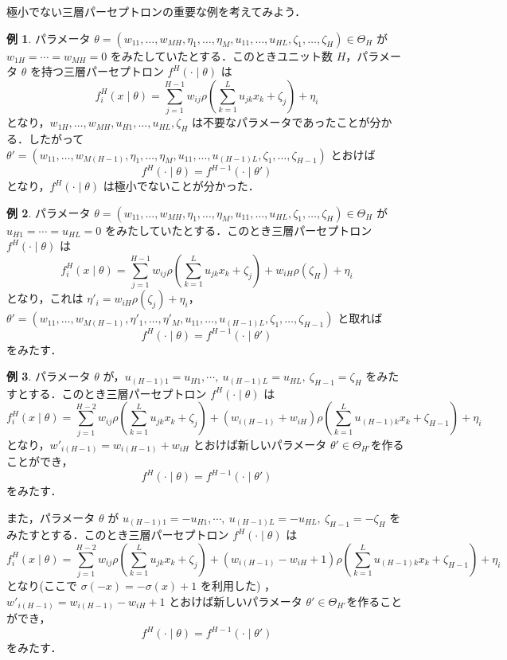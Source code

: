 \documentclass{jsarticle}
\theoremstyle{definition}
\newtheorem{example}{例}
\begin{document}
極小でない三層パーセプトロンの重要な例を考えてみよう．
\begin{example}
  パラメータ $\theta = (w_{11},\ldots, w_{MH}, \eta_1, \ldots, \eta_M, u_{11},\ldots, u_{HL}, \zeta_1, \ldots, \zeta_H) \in \Theta_H$ が $w_{1H} = \cdots = w_{MH} = 0$ をみたしていたとする．このときユニット数 $H$，パラメータ $\theta$ を持つ三層パーセプトロン $f^H(\cdot\mid\theta)$ は
  \[
    f_i^H(x\mid\theta) = \sum_{j=1}^{H-1}w_{ij}\rho\left(\sum_{k=1}^L u_{jk}x_k + \zeta_j\right) + \eta_i
  \]
  となり，$w_{1H}, \ldots, w_{MH}, u_{H1},\ldots, u_{HL}, \zeta_H$ は不要なパラメータであったことが分かる．したがって $\theta' = (w_{11}, \ldots, w_{M(H-1)}, \eta_1, \ldots, \eta_M, u_{11}, \ldots, u_{(H-1)L}, \zeta_1, \ldots, \zeta_{H-1})$ とおけば
  \[
    f^H(\cdot\mid\theta) = f^{H-1}(\cdot\mid\theta')
  \]
  となり，$f^H(\cdot\mid\theta)$ は極小でないことが分かった．
\end{example}
\begin{example}
  パラメータ $\theta = (w_{11},\ldots, w_{MH}, \eta_1, \ldots, \eta_M, u_{11},\ldots, u_{HL}, \zeta_1, \ldots, \zeta_H) \in \Theta_H$ が $u_{H1} = \cdots = u_{HL} = 0$ をみたしていたとする．このとき三層パーセプトロン $f^H(\cdot\mid\theta)$ は
  \begin{equation*}
    f_i^H(x\mid\theta) = \sum_{j=1}^{H-1} w_{ij}\rho\left(\sum_{k=1}^L u_{jk}x_k + \zeta_j\right)+ w_{iH}\rho(\zeta_H) + \eta_i
  \end{equation*}
  となり，これは $\eta'_i = w_{iH}\rho(\zeta_j) + \eta_i$，$\theta' = (w_{11},\ldots, w_{M(H-1)},\eta'_1,\ldots, \eta'_M, u_{11}, \ldots, u_{(H-1)L}, \zeta_1,\ldots, \zeta_{H-1})$ と取れば
  \[
    f^H(\cdot\mid\theta) = f^{H-1}(\cdot\mid\theta')
  \]
  をみたす．
\end{example}
\begin{example}
  パラメータ $\theta$ が，$u_{(H-1)1} = u_{H1}, \cdots,\  u_{(H-1)L} = u_{HL},\  \zeta_{H-1} = \zeta_H$ をみたすとする．このとき三層パーセプトロン $f^H(\cdot\mid\theta)$ は
  \[
    f_i^H(x\mid\theta) = \sum_{j=1}^{H-2}w_{ij}\rho\left(\sum_{k=1}^L u_{jk}x_k + \zeta_j\right) + (w_{i(H-1)} + w_{iH})\rho\left(\sum_{k=1}^L u_{(H-1)k}x_k + \zeta_{H-1}\right) + \eta_i
  \]
  となり，$w'_{i(H-1)} = w_{i(H-1)} + w_{iH}$ とおけば新しいパラメータ $\theta' \in \Theta_{H'}$を作ることができ，
  \[
    f^H(\cdot\mid\theta) = f^{H-1}(\cdot\mid\theta')
  \]
  をみたす．

  また，パラメータ $\theta$ が $u_{(H-1)1} = -u_{H1}, \cdots,\  u_{(H-1)L} = -u_{HL},\  \zeta_{H-1} = -\zeta_H$ をみたすとする．このとき三層パーセプトロン $f^H(\cdot\mid\theta)$ は
  \[
    f_i^H(x\mid\theta) = \sum_{j=1}^{H-2}w_{ij}\rho\left(\sum_{k=1}^L u_{jk}x_k + \zeta_j\right) + (w_{i(H-1)} - w_{iH} + 1)\rho\left(\sum_{k=1}^L u_{(H-1)k}x_k + \zeta_{H-1}\right) + \eta_i
  \]
  となり(ここで $\sigma(-x) = -\sigma(x) + 1$ を利用した) ，$w'_{i(H-1)} = w_{i(H-1)} - w_{iH} + 1$ とおけば新しいパラメータ $\theta' \in \Theta_{H'}$を作ることができ，
  \[
    f^H(\cdot\mid\theta) = f^{H-1}(\cdot\mid\theta')
  \]
  をみたす．
\end{example}
\end{document}
